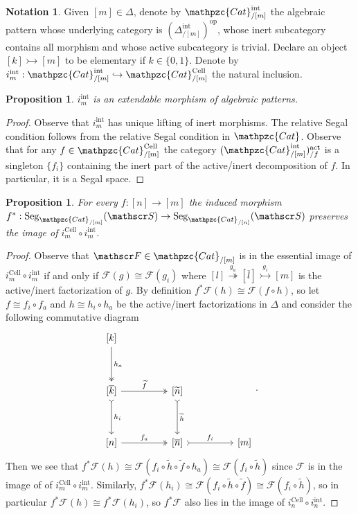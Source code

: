 \documentclass[a4paper, reqno]{amsart}
\newtheorem{prop}[theorem]{Proposition}
\theoremstyle{definition}
\newtheorem{notation}[theorem]{Notation}
\newcommand\cF{\mathscr F}
\newcommand\cS{\mathscr S}
\newcommand\op{\mathrm{op}}
\newcommand\ccat{\mathpzc{Cat}}
\newcommand\cell{\mathrm{Cell}}
\newcommand\act{\mathrm{act}}
\newcommand\inrt{\mathrm{int}}
\newcommand\seg{\mathrm{Seg}}
\begin{document}
\begin{notation}\label{not:inrt}
Given $[m]\in\Delta$, denote by $\ccat^\inrt_{/[m]}$ the algebraic pattern whose underlying category is $(\Delta^\inrt_{/[m]})^\op$, whose inert subcategory contains all morphism and whose active subcategory is trivial. Declare an object $[k]\rightarrowtail[m]$ to be elementary if $k\in\{0,1\}$. Denote by $i_m^\inrt:\ccat^\inrt_{/[m]}\hookrightarrow\ccat^\cell_{/[m]}$ the natural inclusion.
\end{notation}
\begin{prop}
$i_m^\inrt$ is an extendable morphism of algebraic patterns.
\end{prop}
\begin{proof}
Observe that $i_m^\inrt$ has unique lifting of inert morphisms. The relative Segal condition follows from the relative Segal condition in $\ccat$. Observe that for any $f\in\ccat^\cell_{/[m]}$ the category $(\ccat^\inrt_{/[m]})^\act_{/f}$ is a singleton $\{f_i\}$ containing the inert part of the active/inert decomposition of $f$. In particular, it is a Segal space.
\end{proof}
\begin{prop}\label{prop:span}
For every $f:[n]\rightarrow[m]$ the induced morphism $f^*:\seg_{\ccat_{/[m]}}(\cS)\rightarrow\seg_{\ccat_{/[n]}}(\cS)$ preserves the image of $i_m^\cell\circ i_m^\inrt$.
\end{prop}
\begin{proof}
Observe that $\cF\in\ccat_{/[m]}$ is in the essential image of $i_m^\cell\circ i_m^\inrt$ if and only if $\cF(g)\cong\cF(g_i)$ where $[l]\overset{g_a}{\twoheadrightarrow}[\overline{l}]\overset{g_i}{\rightarrowtail}[m]$ is the active/inert factorization of $g$. By definition $f^*\cF(h)\cong \cF(f\circ h)$, so let $f\cong f_i\circ f_a$ and $h\cong h_i\circ h_a$ be the active/inert factorizations in $\Delta$ and consider the following commutative diagram
\[
\begin{tikzcd}[row sep=huge, column sep=huge]
{[k]}\arrow[d, two heads, "h_a"]\\
{[\overline{k}]}\arrow[d, tail, "h_i"]\arrow[r, two heads, "\widetilde{f}"]&{[\widetilde{n}]}\arrow[d, tail, "\widetilde{h}"]\\
{[n]}\arrow[r, two heads, "f_a"]&{[\overline{n}]}\arrow[r, tail, "f_i"]&{[m]}
\end{tikzcd}.
\]
Then we see that $f^*\cF(h)\cong \cF(f_i\circ \widetilde{h}\circ \widetilde{f}\circ h_a)\cong \cF(f_i\circ \widetilde{h})$ since $\cF$ is in the image of of $i_m^\cell\circ i_m^\inrt$. Similarly, $f^*\cF(h_i)\cong \cF(f_i\circ \widetilde{h}\circ \widetilde{f})\cong \cF(f_i\circ \widetilde{h})$, so in particular $f^*\cF(h)\cong f^*\cF(h_i)$, so $f^*\cF$ also lies in the image of $i_n^\cell\circ i_n^\inrt$.
\end{proof}
\end{document}
